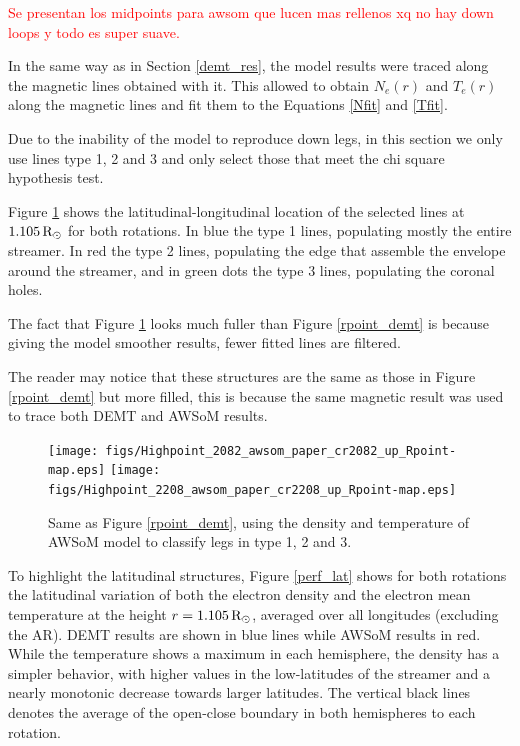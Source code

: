 \documentclass[namedreferences]{solarphysics}
\newcommand{\mrsun}{{\rm R_\odot}}
\begin{document}
\begin{article}
\textcolor{red}{Se presentan los midpoints para awsom que lucen mas rellenos xq no hay down loops y todo es super suave.}

In the same way as in Section \ref{demt_res}, the model results were traced along the magnetic lines obtained with it. This allowed to obtain $N_e(r)$ and $T_e(r)$ along the magnetic lines and fit them to the Equations \ref{Nfit} and \ref{Tfit}.

Due to the inability of the model to reproduce down legs, in this section we only use lines type 1, 2 and 3 and only select those that meet the chi square hypothesis test.

Figure \ref{rpoint_awsom} shows the latitudinal-longitudinal location of the selected lines at $1.105\,\mrsun$ for both rotations. In blue the type 1 lines, populating mostly the entire streamer. In red the type 2 lines, populating the edge that assemble the envelope around the streamer, and in green dots the type 3 lines, populating the coronal holes.

The fact that Figure \ref{rpoint_awsom} looks much fuller than Figure \ref{rpoint_demt} is because giving the model smoother results, fewer fitted lines are filtered.

The reader may notice that these structures are the same as those in Figure \ref{rpoint_demt} but more filled, this is because the same magnetic result was used to trace both DEMT and AWSoM results.


\begin{figure}[h!]
\begin{center}
\texttt{[image: figs/Highpoint\_2082\_awsom\_paper\_cr2082\_up\_Rpoint-map.eps]}
\texttt{[image: figs/Highpoint\_2208\_awsom\_paper\_cr2208\_up\_Rpoint-map.eps]}
\caption{Same as Figure \ref{rpoint_demt}, using the density and temperature of AWSoM model to classify legs in type 1, 2 and 3.}
\label{rpoint_awsom}
\end{center}
\end{figure} 


To highlight the latitudinal structures, Figure \ref{perf_lat} shows for both rotations the latitudinal variation  of both the electron density and the electron mean temperature at the height $r=1.105\,\mrsun$, averaged over all longitudes (excluding the AR). DEMT results are shown in blue lines while AWSoM results in red. While the temperature shows a maximum in each hemisphere, the density has a simpler behavior, with higher values in the low-latitudes of the streamer and a nearly monotonic decrease towards larger latitudes. The vertical black lines denotes the average of the open-close boundary in both hemispheres to each rotation.


\end{article}
\end{document}
